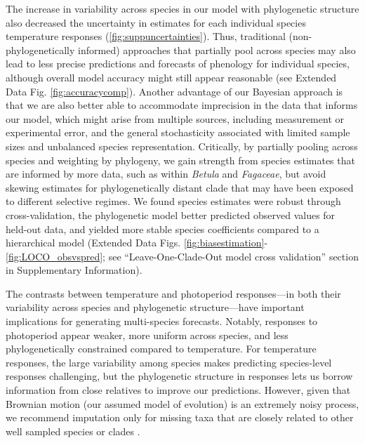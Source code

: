 \documentclass{article}
\begin{document}
The increase in variability across species in our model with phylogenetic structure also decreased the uncertainty in estimates for each individual species temperature responses (\ref{fig:suppuncertainties}). Thus, traditional (non-phylogenetically informed) approaches that partially pool across species  \cite[most hierarchical models in ecology, e.g.,][]{flynn2018,ettinger2020} may also lead to less precise predictions and forecasts of phenology for individual species, although overall model accuracy might still appear reasonable (see Extended Data Fig. \ref{fig:accuracycomp}). Another advantage of our Bayesian approach is that we are also better able to accommodate imprecision in the data that informs our model, which might arise from multiple sources, including measurement or experimental error, and the general stochasticity associated with limited sample sizes and unbalanced species representation. Critically, by partially pooling across species and weighting by phylogeny, we gain strength from species estimates that are informed by more data, such as within \emph{Betula} and \emph{Fagaceae}, but avoid skewing estimates for phylogenetically distant clade that may have been exposed to different selective regimes. We found species estimates were robust through cross-validation, the phylogenetic model better predicted observed values for held-out data, and yielded more stable species coefficients compared to a hierarchical model (Extended Data Figs. \ref{fig:biasestimation}-\ref{fig:LOCO_obsvspred}; see ``Leave-One-Clade-Out model cross validation'' section in Supplementary Information). 

The contrasts between temperature and photoperiod responses---in both their variability across species and phylogenetic structure---have important implications for generating multi-species forecasts. Notably, responses to photoperiod appear weaker, more uniform across species, and less phylogenetically constrained compared to temperature. For temperature responses, the large variability among species makes predicting species-level  responses challenging, but the phylogenetic structure in responses lets us borrow information from close relatives to improve our predictions. However, given that Brownian motion (our assumed model of evolution) is an extremely noisy process, we recommend imputation only for missing taxa that are closely related to other well sampled species or clades \citep{molina2018assessing,molina2023unreliable}.
\end{document}
